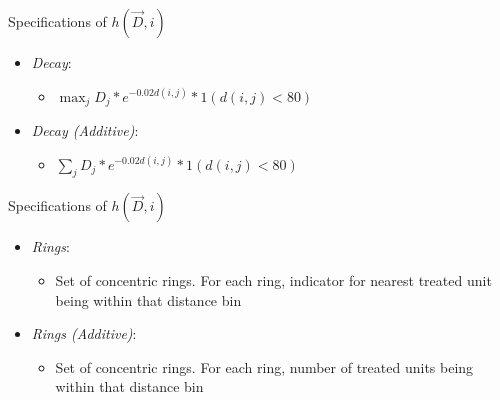 \documentclass[aspectratio=169]{beamer}
\begin{document}

\begin{frame}{Specifications of $h(\vec{D}, i)$}
    
    \begin{itemize}
        \item \textit{Decay}: 
        \begin{itemize}
            \item $\max_j D_j * e^{-0.02 d(i,j)} * 1(d(i,j) < 80)$
        \end{itemize}
        
        \item \textit{Decay (Additive)}: 
        \begin{itemize}
            \item $\sum_j D_j * e^{-0.02 d(i,j)} * 1(d(i,j) < 80)$
        \end{itemize}
        
    \end{itemize}

\end{frame}




\begin{frame}{Specifications of $h(\vec{D}, i)$}
    
    \begin{itemize}
        \item \textit{Rings}: 
        \begin{itemize}
            \item Set of concentric rings. For each ring, indicator for nearest treated unit being within that distance bin
        \end{itemize}
        
        \item \textit{Rings (Additive)}: 
        \begin{itemize}
            \item Set of concentric rings. For each ring, number of treated units being within that distance bin
        \end{itemize}
    \end{itemize}

\end{frame}

\end{document}
